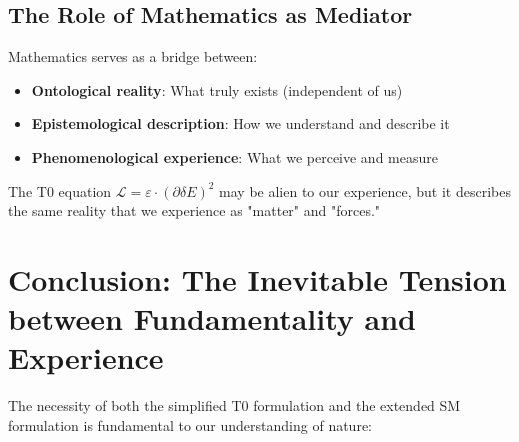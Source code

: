 	\subsection{The Role of Mathematics as Mediator}
	
	\begin{tcolorbox}[colback=purple!5!white,colframe=purple!75!black,title=Mathematics as Universal Language]
		Mathematics serves as a bridge between:
		\begin{itemize}
			\item \textbf{Ontological reality}: What truly exists (independent of us)
			\item \textbf{Epistemological description}: How we understand and describe it
			\item \textbf{Phenomenological experience}: What we perceive and measure
		\end{itemize}
		
		The T0 equation $\mathcal{L} = \varepsilon \cdot (\partial\delta E)^2$ may be alien to our experience, but it describes the same reality that we experience as "matter" and "forces."
	\end{tcolorbox}
	
	\section{Conclusion: The Inevitable Tension between Fundamentality and Experience}
	
	The necessity of both the simplified T0 formulation and the extended SM formulation is fundamental to our understanding of nature:
	
